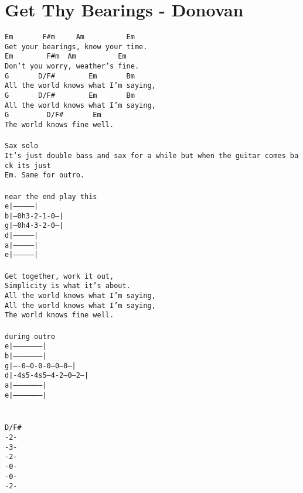 \newpage
\section{Get Thy Bearings - Donovan}
\label{Get Thy Bearings - Donovan}
\texttt{Em\ \ \ \ \ \ \ F\#m\ \ \ \ \ Am\ \ \ \ \ \ \ \ \ \ Em\\
Get\ your\ bearings,\ know\ your\ time.\\
Em\ \ \ \ \ \ \ \ F\#m\ \ Am\ \ \ \ \ \ \ \ \ \ Em\\
Don't\ you\ worry,\ weather's\ fine.\\
G\ \ \ \ \ \ \ D/F\#\ \ \ \ \ \ \ \ Em\ \ \ \ \ \ \ Bm\\
All\ the\ world\ knows\ what\ I'm\ saying,\\
G\ \ \ \ \ \ \ D/F\#\ \ \ \ \ \ \ \ Em\ \ \ \ \ \ \ Bm\\
All\ the\ world\ knows\ what\ I'm\ saying,\\
G\ \ \ \ \ \ \ \ \ D/F\#\ \ \ \ \ \ \ Em\\
The\ world\ knows\ fine\ well.\\
\\
Sax\ solo\\
It's\ just\ double\ bass\ and\ sax\ for\ a\ while\ but\ when\ the\ guitar\ comes\ back\ its\ just\ \\
Em.\ Same\ for\ outro.\\
\\
near\ the\ end\ play\ this\\
e|--------------|\\
b|--0h3-2-1-0---|\\
g|--0h4-3-2-0---|\\
d|--------------|\\
a|--------------|\\
e|--------------|\\
\\
Get\ together,\ work\ it\ out,\\
Simplicity\ is\ what\ it's\ about.\\
All\ the\ world\ knows\ what\ I'm\ saying,\\
All\ the\ world\ knows\ what\ I'm\ saying,\\
The\ world\ knows\ fine\ well.\\
\\
during\ outro\\
e|---------------------|\\
b|---------------------|\\
g|----0---0-0-0--0--0--|\\
d|-4s5-4s5--4-2--0--2--|\\
a|---------------------|\\
e|---------------------|\\
\\
\\
D/F\#\\
-2-\\
-3-\\
-2-\\
-0-\\
-0-\\
-2-\\
}
